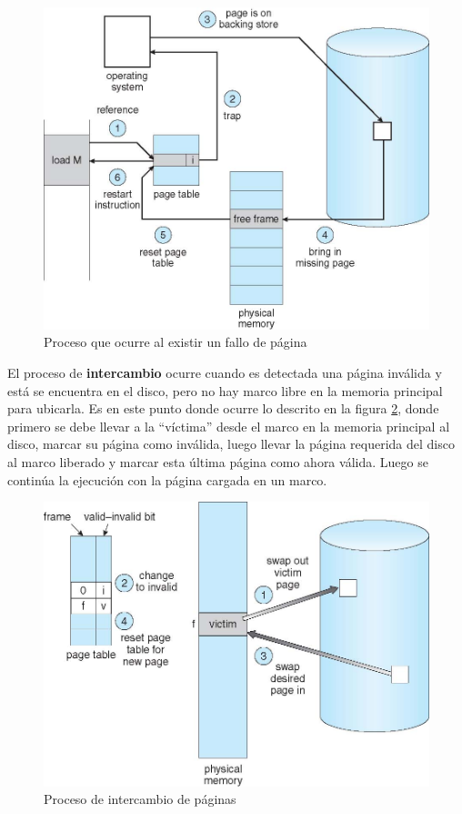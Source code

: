 \begin{figure}[htbp]
\centering
\includegraphics[scale=1]{img/C07_memoria/fallo_pagina.jpg}
\caption{Proceso que ocurre al existir un fallo de página}
\label{fig:fallo_pagina}
\end{figure}

El proceso de \textbf{intercambio} ocurre cuando es detectada una página
inválida y está se encuentra en el disco, pero no hay marco libre en la memoria
principal para ubicarla. Es en este punto donde ocurre lo descrito en la figura
\ref{fig:intercambio}, donde primero se debe llevar a la ``víctima'' desde el
marco en la memoria principal al disco, marcar su página como inválida, luego
llevar la página requerida del disco al marco liberado y marcar esta última
página como ahora válida. Luego se continúa la ejecución con la página cargada
en un marco.

\begin{figure}[htbp]
\centering
\includegraphics[scale=1]{img/C07_memoria/intercambio.jpg}
\caption{Proceso de intercambio de páginas}
\label{fig:intercambio}
\end{figure}

